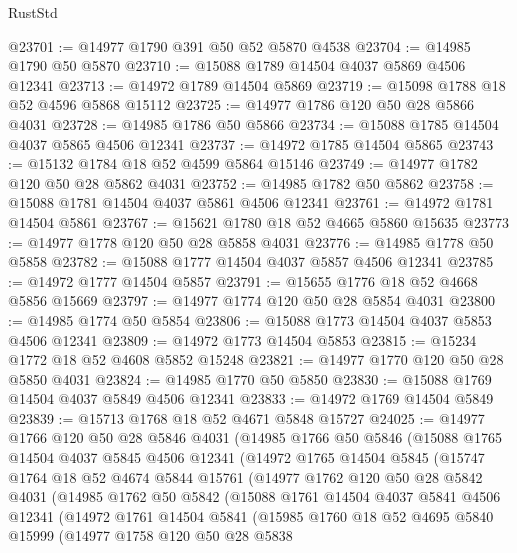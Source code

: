 \begin{lexlean}{RustStd}
\begin{coremodule}
@23701 := @14977 @1790 @391 @50 @52 @5870 @4538
@23704 := @14985 @1790 @50 @5870
@23710 := @15088 @1789 @14504 @4037 @5869 @4506 @12341
@23713 := @14972 @1789 @14504 @5869
@23719 := @15098 @1788 @18 @52 @4596 @5868 @15112
@23725 := @14977 @1786 @120 @50 @28 @5866 @4031
@23728 := @14985 @1786 @50 @5866
@23734 := @15088 @1785 @14504 @4037 @5865 @4506 @12341
@23737 := @14972 @1785 @14504 @5865
@23743 := @15132 @1784 @18 @52 @4599 @5864 @15146
@23749 := @14977 @1782 @120 @50 @28 @5862 @4031
@23752 := @14985 @1782 @50 @5862
@23758 := @15088 @1781 @14504 @4037 @5861 @4506 @12341
@23761 := @14972 @1781 @14504 @5861
@23767 := @15621 @1780 @18 @52 @4665 @5860 @15635
@23773 := @14977 @1778 @120 @50 @28 @5858 @4031
@23776 := @14985 @1778 @50 @5858
@23782 := @15088 @1777 @14504 @4037 @5857 @4506 @12341
@23785 := @14972 @1777 @14504 @5857
@23791 := @15655 @1776 @18 @52 @4668 @5856 @15669
@23797 := @14977 @1774 @120 @50 @28 @5854 @4031
@23800 := @14985 @1774 @50 @5854
@23806 := @15088 @1773 @14504 @4037 @5853 @4506 @12341
@23809 := @14972 @1773 @14504 @5853
@23815 := @15234 @1772 @18 @52 @4608 @5852 @15248
@23821 := @14977 @1770 @120 @50 @28 @5850 @4031
@23824 := @14985 @1770 @50 @5850
@23830 := @15088 @1769 @14504 @4037 @5849 @4506 @12341
@23833 := @14972 @1769 @14504 @5849
@23839 := @15713 @1768 @18 @52 @4671 @5848 @15727
@24025 := @14977
    @1766
    @120
    @50
    @28
    @5846
    @4031
    (@14985
      @1766
      @50
      @5846
      (@15088
        @1765
        @14504
        @4037
        @5845
        @4506
        @12341
        (@14972
          @1765
          @14504
          @5845
          (@15747
            @1764
            @18
            @52
            @4674
            @5844
            @15761
            (@14977
              @1762
              @120
              @50
              @28
              @5842
              @4031
              (@14985
                @1762
                @50
                @5842
                (@15088
                  @1761
                  @14504
                  @4037
                  @5841
                  @4506
                  @12341
                  (@14972
                    @1761
                    @14504
                    @5841
                    (@15985
                      @1760
                      @18
                      @52
                      @4695
                      @5840
                      @15999
                      (@14977
                        @1758
                        @120
                        @50
                        @28
                        @5838

\end{coremodule}
\end{lexlean}
